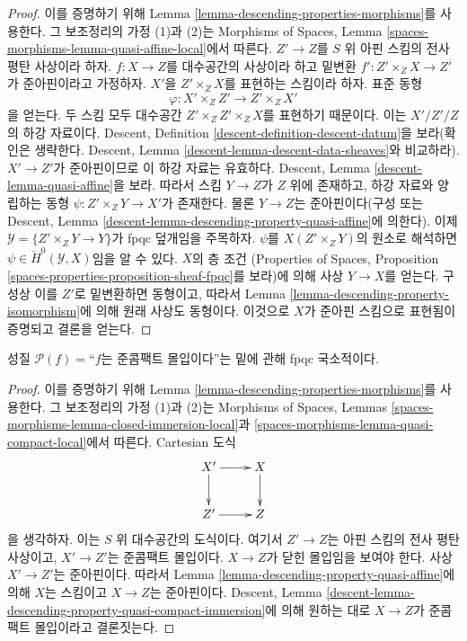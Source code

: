 \begin{proof}
이를 증명하기 위해 Lemma \ref{lemma-descending-properties-morphisms}를
사용한다. 그 보조정리의 가정 (1)과 (2)는 Morphisms of Spaces, Lemma
\ref{spaces-morphisms-lemma-quasi-affine-local}에서 따른다. $Z'\to Z$를
$S$ 위 아핀 스킴의 전사 평탄 사상이라 하자. $f:X\to Z$를 대수공간의
사상이라 하고 밑변환 $f':Z'\times_ZX\to Z'$가 준아핀이라고 가정하자.
$X'$을 $Z'\times_ZX$를 표현하는 스킴이라 하자. 표준 동형
$$
\varphi : X' \times_Z Z' \longrightarrow Z' \times_Z X'
$$
을 얻는다. 두 스킴 모두 대수공간 $Z'\times_ZZ'\times_ZX$를 표현하기
때문이다. 이는 $X'/Z'/Z$의 하강 자료이다. Descent, Definition
\ref{descent-definition-descent-datum}을 보라(확인은 생략한다. Descent,
Lemma \ref{descent-lemma-descent-data-sheaves}와 비교하라). $X'\to Z'$가
준아핀이므로 이 하강 자료는 유효하다. Descent, Lemma
\ref{descent-lemma-quasi-affine}을 보라. 따라서 스킴 $Y\to Z$가 $Z$ 위에 존재하고,
하강 자료와 양립하는 동형 $\psi:Z'\times_ZY\to X'$가 존재한다. 물론
$Y\to Z$는 준아핀이다(구성 또는 Descent, Lemma
\ref{descent-lemma-descending-property-quasi-affine}에 의한다). 이제
$\mathcal{Y}=\{Z'\times_ZY\to Y\}$가 fpqc 덮개임을 주목하자.
$\psi$를 $X(Z'\times_ZY)$의 원소로 해석하면
$\psi\in\check{H}^0(\mathcal{Y},X)$임을 알 수 있다. $X$의 층 조건
(Properties of Spaces, Proposition
\ref{spaces-properties-proposition-sheaf-fpqc}를 보라)에 의해 사상
$Y\to X$를 얻는다. 구성상 이를 $Z'$로 밑변환하면 동형이고, 따라서
Lemma \ref{lemma-descending-property-isomorphism}에 의해 원래 사상도
동형이다. 이것으로 $X$가 준아핀 스킴으로 표현됨이 증명되고 결론을
얻는다.
\end{proof}

\begin{lemma}
\label{lemma-descending-property-quasi-compact-immersion}
성질 $\mathcal{P}(f)=$``$f$는 준콤팩트 몰입이다''는 밑에 관해 fpqc
국소적이다.
\end{lemma}

\begin{proof}
이를 증명하기 위해 Lemma \ref{lemma-descending-properties-morphisms}를
사용한다. 그 보조정리의 가정 (1)과 (2)는 Morphisms of Spaces, Lemmas
\ref{spaces-morphisms-lemma-closed-immersion-local}과
\ref{spaces-morphisms-lemma-quasi-compact-local}에서 따른다. Cartesian 도식
$$
\xymatrix{
X' \ar[r] \ar[d] & X \ar[d] \\
Z' \ar[r] & Z
}
$$
을 생각하자. 이는 $S$ 위 대수공간의 도식이다. 여기서 $Z'\to Z$는
아핀 스킴의 전사 평탄 사상이고,
$X'\to Z'$는 준콤팩트 몰입이다.
$X\to Z$가 닫힌 몰입임을 보여야 한다. 사상 $X'\to Z'$는
준아핀이다. 따라서 Lemma \ref{lemma-descending-property-quasi-affine}에
의해 $X$는 스킴이고 $X\to Z$는 준아핀이다. Descent, Lemma
\ref{descent-lemma-descending-property-quasi-compact-immersion}에 의해
원하는 대로 $X\to Z$가 준콤팩트 몰입이라고 결론짓는다.
\end{proof}

